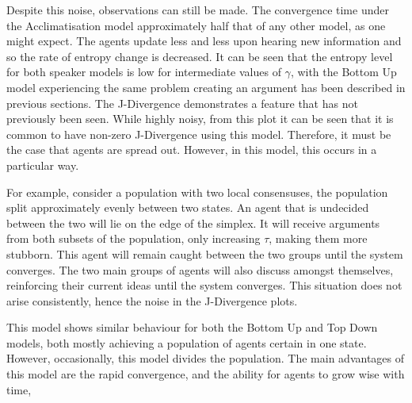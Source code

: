 Despite this noise, observations can still be made. The convergence time under the Acclimatisation model approximately half that of any other model, as one might expect. The agents update less and less upon hearing new information and so the rate of entropy change is decreased. It can be seen that the entropy level for both speaker models is low for intermediate values of $\gamma$, with the Bottom Up model experiencing the same problem creating an argument has been described in previous sections. The J-Divergence demonstrates a feature that has not previously been seen. While highly noisy, from this plot it can be seen that it is common to have non-zero J-Divergence using this model. Therefore, it must be the case that agents are spread out. However, in this model, this occurs in a particular way. 

For example, consider a population with two local consensuses, the population split approximately evenly between two states. An agent that is undecided between the two will lie on the edge of the simplex. It will receive arguments from both subsets of the population, only increasing $\tau$, making them more stubborn. This agent will remain caught between the two groups until the system converges. The two main groups of agents will also discuss amongst themselves, reinforcing their current ideas until the system converges. This situation does not arise consistently, hence the noise in the J-Divergence plots. 


This model shows similar behaviour for both the Bottom Up and Top Down models, both mostly achieving a population of agents certain in one state. However, occasionally, this model divides the population. The main advantages of this model are the rapid convergence, and the ability for agents to grow wise with time, 





